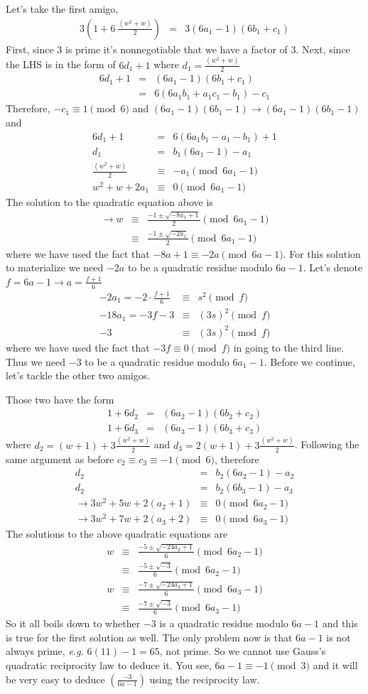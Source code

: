 \documentclass[aps,preprint,preprintnumbers,nofootinbib,showpacs,prd]{revtex4-1}
\newcommand{\eg}{{\it e.g.} }
\newcommand{\nbea}{\begin{eqnarray*}}
\newcommand{\neea}{\end{eqnarray*}}
\begin{document}
Let's take the first amigo,
%
\nbea
3\left ( 1 + 6 ~ \frac{(w^2+w)}{2} \right) & = & 3(6a_1 - 1)(6b_1 + c_1)
\neea
%
First, since $3$ is prime it's nonnegotiable that we have a factor of 3. Next, since the LHS is in the form of $6d_1 + 1$ where $d_1 =  \frac{(w^2+w)}{2}$
%
\nbea
6d_1 + 1 & = & (6a_1 - 1)(6b_1 + c_1) \\
& = & 6(6a_1b_1 + a_1c_1 - b_1) - c_1
\neea
%
Therefore, $-c_1 \equiv 1 \pmod{6}$ and $ (6a_1 - 1)(6b_1 - 1) \to  (6a_1 - 1)(6b_1 - 1)$ and
%
\nbea
6d_1 + 1 & = & 6(6a_1b_1 - a_1 - b_1) + 1 \\
d_1 & = & b_1(6a_1 - 1) - a_1 \\
 \frac{(w^2+w)}{2} & \equiv & -a_1 \pmod{6a_1 - 1} \\
 w^2 + w + 2a_1 & \equiv & 0 \pmod{6a_1 - 1}
\neea
%
The solution to the quadratic equation above is
%
\nbea
\to w & \equiv & \frac{-1 \pm \sqrt{-8a_1 + 1}}{2} \pmod{6a_1 - 1} \\
& \equiv & \frac{-1 \pm \sqrt{-2a_1}}{2} \pmod{6a_1 - 1}
\neea
%
where we have used the fact that $-8a + 1 \equiv -2a \pmod{6a-1}$. For this solution to materialize we need $-2a$ to be a quadratic residue modulo $6a - 1$. Let's denote $f = 6a - 1 \to a = \frac{f + 1}{6}$
%
\nbea
-2a_1 = -2\cdot \frac{f + 1}{6} & \equiv & s^2 \pmod{f} \\
-18a_1 = -3f - 3 & \equiv & (3s)^2 \pmod{f} \\
-3 & \equiv & (3s)^2 \pmod{f}
\neea
%
where we have used the fact that $-3f \equiv 0 \pmod{f}$ in going to the third line. Thus we need $-3$ to be a quadratic residue modulo $6a_1 - 1$. Before we continue, let's tackle the other two amigos.

Those two have the form
%
\nbea
1 + 6d_2 & = & (6a_2 - 1)(6b_2 + c_2) \\
1 + 6d_3 & = & (6a_3 - 1)(6b_3 + c_3)
\neea
%
where $d_2 = (w + 1) +3 \frac{(w^2+w)}{2}$ and $d_3 = 2(w + 1) +3 \frac{(w^2+w)}{2}$. Following the same argument as before $c_2 \equiv c_3 \equiv -1 \pmod{6}$, therefore
%
\nbea
d_2 & = & b_2(6a_2 - 1) - a_2 \\
d_2 & = & b_2(6b_3 - 1) - a_3 \\
\to 3w^2+5w + 2(a_2 + 1) & \equiv & 0 \pmod{6a_2 - 1} \\
\to 3w^2+7w + 2(a_3 + 2) & \equiv & 0 \pmod{6a_3 - 1}
\neea
%
The solutions to the above quadratic equations are
%
\nbea
w & \equiv & \frac{-5 \pm \sqrt{-24a_2 + 1}}{6} \pmod{6a_2 - 1} \\
& \equiv & \frac{-5 \pm \sqrt{-3}}{6} \pmod{6a_2 - 1} \\
w & \equiv & \frac{-7 \pm \sqrt{-24a_3 + 1}}{6} \pmod{6a_3 - 1} \\
& \equiv & \frac{-7 \pm \sqrt{-3}}{6} \pmod{6a_3 - 1}
\neea
%
So it all boils down to whether $-3$ is a quadratic residue modulo $6a - 1$ and this is true for the first solution as well. The only problem now is that $6a-1$ is not always prime, \eg $6(11) - 1 = 65$, not prime. So we cannot use Gauss's quadratic reciprocity law to deduce it. You see, $6a - 1 \equiv -1 \pmod{3}$ and it will be very easy to deduce $\left ( \frac{-3}{6a-1}\right )$ using the reciprocity law.
\end{document}

